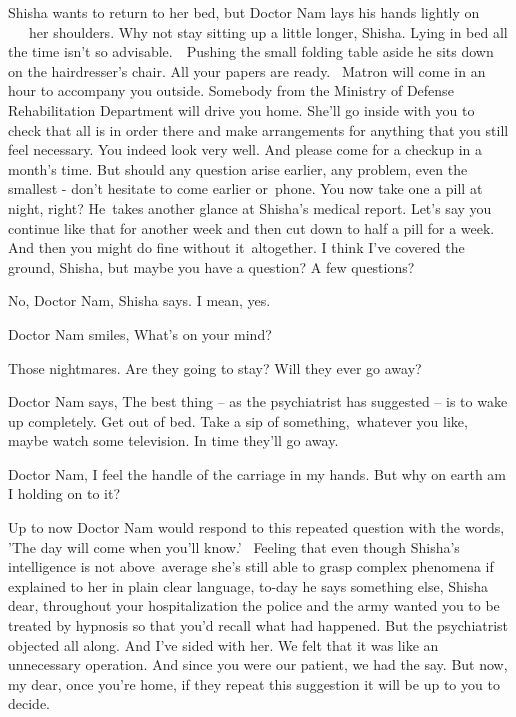 \documentclass[letterpaper]{article}
\begin{document}
Shisha wants to return to her bed, but Doctor Nam lays his hands lightly on \ \ \ her shoulders. {\textquotedbl}Why not
stay sitting up a little longer, Shisha. Lying in bed all the time isn't so advisable.{\textquotedbl}\ \ Pushing the
small folding table aside he sits down on the hairdresser's chair. {\textquotedbl}All your papers are
ready.\textcolor{red}{~} Matron will come in an hour to accompany you outside. Somebody from the Ministry of Defense
Rehabilitation Department will drive you home. She'll go inside with you to check that all is in order there and make
arrangements for anything that you still feel necessary. You indeed look very well. And please come for a checkup in a
month's time.  But should any question arise earlier, any problem, even the smallest - don't hesitate to come earlier
or~phone. You now take one a pill at night, right?{\textquotedbl} He~takes another glance at Shisha's medical report.
{\textquotedbl}Let's say you continue like that for another week and then cut down to half a pill for a week. And then
you might do fine without it\ altogether. I think I've covered the ground, Shisha, but maybe you have a question? A few
questions?{\textquotedbl} 

{\textquotedbl}No, Doctor Nam,{\textquotedbl} Shisha says. {\textquotedbl}I mean, yes.{\textquotedbl} 

Doctor Nam smiles, {\textquotedbl}What's on your mind?{\textquotedbl} 

{\textquotedbl}Those nightmares. Are they going to stay? Will they ever go away?{\textquotedbl} 

Doctor Nam says, {\textquotedbl}The best thing -- as the psychiatrist has suggested -- is to wake up completely. Get out
of bed. Take a sip of something,\textcolor[rgb]{0.0,0.4392157,0.7529412}{\ }whatever you like, maybe watch some
television. In time they{}'ll go away.{\textquotedbl}

{\textquotedbl}Doctor Nam, I feel the handle of the carriage in my hands. But why on earth am I holding on to
it?{\textquotedbl} 

Up to now Doctor Nam would respond to this repeated question with the words, 'The day will come when you'll know.'
~Feeling that even though Shisha{}'s intelligence is not above\ average she's still able to grasp complex phenomena if
explained to her in plain clear language, to-day he says something else, {\textquotedbl}Shisha dear, throughout your
hospitalization the police and the army wanted you to be treated by hypnosis so that you'd recall what had happened.
But the psychiatrist objected all along. And I've sided with her. We felt that it was like an unnecessary operation.
And since you were our patient, we had the say. But now, my dear, once you're home, if they repeat this suggestion it
will be up to you to decide.{\textquotedbl} 
\end{document}

